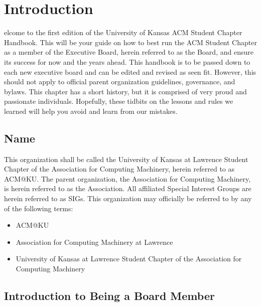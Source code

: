 %
%
\let\textcircled=\pgftextcircled
\chapter{Introduction}
\label{chap:intro}

elcome to the first edition of the University of Kansas ACM Student
Chapter Handbook. This will be your guide on how to best run the ACM Student
Chapter as a member of the Executive Board, herein referred to as the Board, and
ensure its success for now and the years ahead. This handbook is to be passed down
to each new executive board and can be edited and revised as seen fit. However,
this should not apply to official parent organization guidelines, governance,
and bylaws. This chapter has a short history, but it is comprised of very proud
and passionate individuals. Hopefully, these tidbits on the lessons and rules we
learned will help you avoid and learn from our mistakes.

\section{Name}
\label{sec:sec01}

This organization shall be called the University of Kansas at Lawrence Student
Chapter of the Association for Computing Machinery, herein referred to as ACM@KU.
The parent organization, the Association for Computing Machinery, is herein
referred to as the Association. All affiliated Special Interest Groups are herein
referred to as SIGs. This organization may officially be referred to by any of
the following terms:
\begin{itemize}
  \item ACM@KU
  \item Association for Computing Machinery at Lawrence
  \item University of Kansas at Lawrence Student Chapter of the Association for
        Computing Machinery
\end{itemize}

\section{Introduction to Being a Board Member}
\label{sec:sec02}

%

